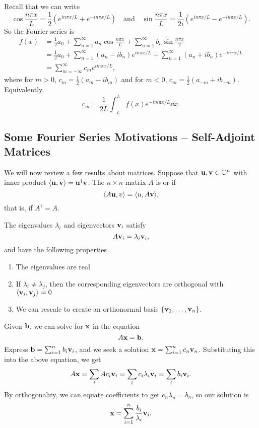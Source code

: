 \documentclass[a4paper]{scrartcl}
\begin{document}
Recall that we can write
$$
\cos \frac{n \pi x}{L} = \frac{1}{2}\left(e^{in \pi x/L} + e^{-i n \pi x/L}\right) \quad \text{and} \quad \sin \frac{n \pi x}{L} = \frac{1}{2i} \left(e^{i n \pi x/L} - e^{-i n \pi x/L} \right).
$$
So the Fourier series is
\begin{align*}
    f(x) &= \frac{1}{2} a_{0}+\sum_{n=1}^{\infty} a_{n} \cos \frac{n \pi x}{L}+\sum_{n=1}^{\infty} b_{n} \sin \frac{n \pi x}{2} \\
    &= \frac{1}{2} a_{0}+\sum_{n=1}^{\infty}\left(a_{n}-i b_{n}\right) e^{i n \pi x / L}+\sum_{n=1}^{\infty}\left(a_{n}+i b_{n}\right) e^{-i n \pi  x / L} \\
    &= \sum_{m=-\infty}^{\infty} c_{m} e^{i m \pi x / L},
\end{align*}
where for $m > 0$, $c_m = \frac{1}{2}(a_m - i b_m)$ and for $m < 0$, $c_m = \frac{1}{2}(a_{-m} + i b_{-m})$. Equivalently,
$$
c_m = \frac{1}{2L} \int_{-L}^L f(x) e^{-i m \pi x/L } \dd x.
$$

\subsection{Some Fourier Series Motivations -- Self-Adjoint Matrices}

We will now review a few results about matrices. Suppose that $\mathbf{u}, \mathbf{v} \in \mathbb{C}^n$ with inner product $\langle \mathbf{u}, \mathbf{v}\rangle = \mathbf{u}^\dagger \mathbf{v}$.
The $n \times n$ matrix $A$ is  or  if
$$
\langle A \mathbf{u}, v\rangle = \langle u, A \mathbf{v}\rangle,
$$
that is, if $A^\dagger = A$.

The eigenvalues $\lambda_i$ and eigenvectors $\mathbf{v}_i$ satisfy
$$
A \mathbf{v}_i = \lambda_i \mathbf{v}_i,
$$
and have the following properties
\begin{enumerate}[label=(\roman*)]
    \item The eigenvalues are real
    \item If $\lambda_i \neq \lambda_j$, then the corresponding eigenvectors are orthogonal with $\langle \mathbf{v}_i, \mathbf{v}_j\rangle = 0$
    \item We can rescale to create an orthonormal basis $\{\mathbf{v}_1, \dots, \mathbf{v}_n\}$.
\end{enumerate}

Given $\mathbf{b}$, we can solve for $\mathbf{x}$ in the equation
$$
A \mathbf{x} = \mathbf{b}.
$$
Express $\mathbf{b} = \sum_{i = 1}^n b_i \mathbf{v}_i$, and we seek a solution $\mathbf{x} = \sum_{i = 1}^n c_n \mathbf{v}_n$. Substituting this into the above equation, we get
$$
A \mathbf{x} = \sum_{i} A c_i \mathbf{v}_i = \sum_{i} c_i \lambda_i \mathbf{v}_i = \sum_{i} b_i \mathbf{v}_i.
$$
By orthogonality, we can equate coefficients to get $c_n \lambda_n = b_n$, so our solution is
$$
\mathbf{x} = \sum_{i = 1}^n \frac{b_i}{\lambda_i} \mathbf{v}_i.
$$
\end{document}
